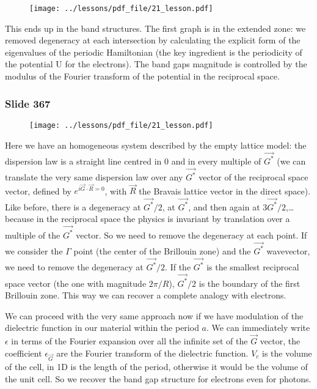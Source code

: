 \documentclass[../main/main.tex]{subfiles}
\begin{document}
\begin{figure}[h!]
\centering
\texttt{[image: ../lessons/pdf\_file/21\_lesson.pdf]}
\end{figure}

This ends up in the band structures. The first graph is in the extended zone: we removed degeneracy at each intersection by calculating the explicit form of the eigenvalues of the periodic Hamiltonian (the key ingredient is the periodicity of the potential U for the electrons).
The band gaps magnitude is controlled by the modulus of the Fourier transform of the potential in the reciprocal space.

\newpage

\subsubsection{Slide 367} 

\begin{figure}[h!]
\centering
\texttt{[image: ../lessons/pdf\_file/21\_lesson.pdf]}
\end{figure}

Here we have an homogeneous system described by the empty lattice model: the dispersion law is a straight line centred in 0 and in every multiple of $\vec{G^*}$ (we can translate the very same dispersion law over any $\vec{G^*}$ vector of the reciprocal space vector, defined by $e^{i \vec{G} \cdot \vec{R} = 0}$, with $\vec{R}$ the Bravais lattice vector in the direct space).
Like before, there is a degeneracy at $\vec{G^*}/2$, at $\vec{G^*}$, and then again at $3\vec{G^*}/2$,… because in the reciprocal space the physics is invariant by translation over a multiple of the $\vec{G^*}$ vector.
So we need to remove the degeneracy at each point.  If we consider the $\Gamma$ point (the center of the Brillouin zone) and the $\vec{G^*}$ wavevector, we need to remove the degeneracy at $\vec{G^*}/2$.
If the $\vec{G^*}$ is the smallest reciprocal space vector (the one with magnitude $2\pi /R$), $\vec{G^*}/2$ is the boundary of the first Brillouin zone. 
This way we can recover a complete analogy with electrons.

We can proceed with the very same approach now if we have modulation of the dielectric function in our material within the period $a$.
We can immediately write $\epsilon$ in terms of the Fourier expansion over all the infinite set of the  $\vec{G}$ vector, the coefficient $\epsilon_\vec{G}$ are the Fourier transform of the dielectric function.
$V_c$ is the volume of the cell, in 1D is the length of the period, otherwise it would be the volume of the unit cell.
So we recover the band gap structure for electrons even for photons.
\end{document}
